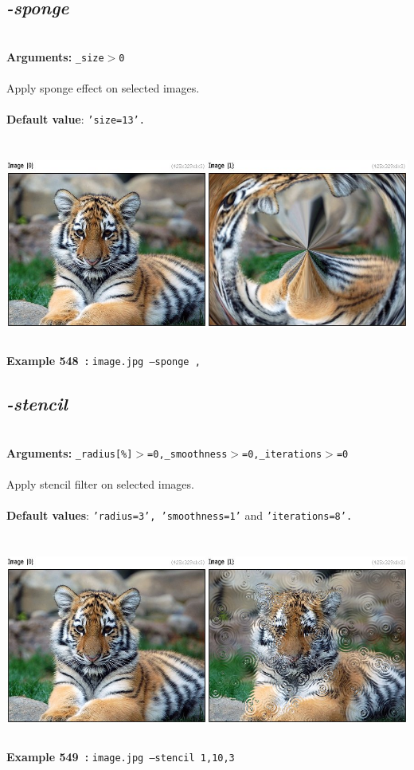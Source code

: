 \documentclass[a4paper,11pt,twoside]{book}
\begin{document}
\subsection{\emph{-sponge} }\vspace*{-0.5em}
~\\\textbf{Arguments: } 
{\small \texttt{\_size$>$0}}\\~\\
Apply sponge effect on selected images.
~\\~\\\textbf{Default value}: {\small \texttt{'size=13'.}}
\begin{center}\includegraphics[keepaspectratio=true,height=7cm,width=\textwidth]{img/gmic_def548.jpg}\\
{\footnotesize \textbf{Example 548~:} \texttt{image.jpg --sponge ,}}
\end{center}

\subsection{\emph{-stencil} }\vspace*{-0.5em}
~\\\textbf{Arguments: } 
{\small \texttt{\_radius[\%]$>$=0,\_smoothness$>$=0,\_iterations$>$=0}}\\~\\
Apply stencil filter on selected images.
~\\~\\\textbf{Default values}: {\small \texttt{'radius=3', 'smoothness=1'} and \texttt{'iterations=8'.}}
\begin{center}\includegraphics[keepaspectratio=true,height=7cm,width=\textwidth]{img/gmic_def549.jpg}\\
{\footnotesize \textbf{Example 549~:} \texttt{image.jpg --stencil 1,10,3}}
\end{center}
\end{document}
